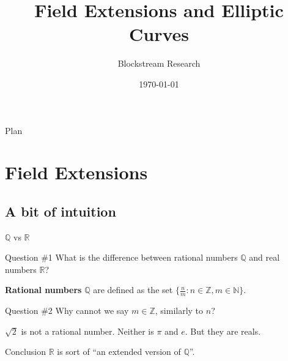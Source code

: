 \documentclass{zkdl-presentation-template}
\title[Field Extensions and Elliptic Curves]{\textbf{Field Extensions and Elliptic Curves}}
\author{Blockstream Research}
\date{\today}
\begin{document}
    \maketitleframe

    \begin{frame}{Plan}
      \tableofcontents
    \end{frame}

    \section{Field Extensions}

    \subsection{A bit of intuition}

    \begin{frame}{$\mathbb{Q}$ vs $\mathbb{R}$}
        \begin{questionblock}{Question \#1}
            What is the difference between rational numbers $\mathbb{Q}$ and real numbers $\mathbb{R}$?\pause
        \end{questionblock}

        \begin{definition}
            \textbf{Rational numbers} $\mathbb{Q}$ are defined as the set $\{\frac{n}{m}: n \in \mathbb{Z}, m \in \mathbb{N}\}$.\pause
        \end{definition}

        \begin{questionblock}{Question \#2}
            Why cannot we say $m \in \mathbb{Z}$, similarly to $n$?\pause
        \end{questionblock}

        \begin{theorem}
            $\sqrt{2}$ is not a rational number. Neither is $\pi$ and $e$. But they are reals.\pause
        \end{theorem}

        \begin{remarkblock}{Conclusion}
            $\mathbb{R}$ is sort of ``an extended version of $\mathbb{Q}$''.
        \end{remarkblock}
    \end{frame}
\end{document}
